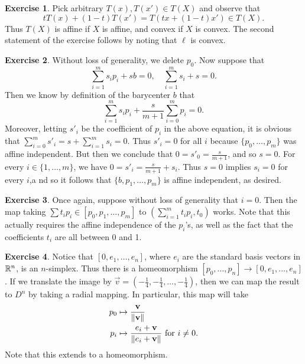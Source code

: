 \documentclass[10pt]{article}
\theoremstyle{definition}
\newtheorem{intex}{Exercise}[section]
\newenvironment{exercise}{\begin{intex}\label{\theintex}}{\end{intex}}
\begin{document}
\begin{exercise} \leavevmode
Pick arbitrary $T(x),T(x')\in T(X)$ and observe that \[tT(x)+(1-t)T(x')=T(tx+(1-t)x')\in T(X).\] Thus $T(X)$ is affine if $X$ is affine, and convex if $X$ is convex. The second statement of the exercise follows by noting that $\ell$ is convex. 
\end{exercise} 

\begin{exercise} \leavevmode
Without loss of generality, we delete $p_0$. Now suppose that \[\sum_{i=1}^ms_ip_i+sb=0,\quad\sum_{i=1}^ms_i+s=0.\] Then we know by definition of the barycenter $b$ that \[\sum_{i=1}^ms_ip_i+\frac s{m+1}\sum_{i=0}^mp_i=0.\] Moreover, letting $s'_i$ be the coefficient of $p_i$ in the above equation, it is obvious that $\sum_{i=0}^ms'_i=s+\sum_{i=1}^ms_i=0$. Thus $s'_i=0$ for all $i$ because $\{p_0,\dots,p_m\}$ was affine independent. But then we conclude that $0=s'_0=\frac s{m+1}$, and so $s=0$. For every $i\in\{1,\dots,m\}$, we have $0=s'_i=\frac s{m+1}+s_i$. Thus $s=0$ implies $s_i=0$ for every $i$,a nd so it follows that $\{b,p_1,\dots,p_m\}$ is affine independent, as desired.
\end{exercise} 

\begin{exercise} \leavevmode
Once again, suppose without loss of generality that $i=0$. Then the map taking $\sum t_ip_i\in[p_0,p_1,\dots,p_m]$ to $\left(\sum_{i=1}^mt_ip_i,t_0\right)$ works. Note that this actually requires the affine independence of the $p_i$'s, as well as the fact that the coefficients $t_i$ are all between 0 and 1. 
\end{exercise} 

\begin{exercise} \leavevmode
Notice that $[0,e_1,\dots,e_n]$, where $e_i$ are the standard basis vectors in $\mathbb{R}^n$, is an $n$-simplex. Thus there is a homeomorphism $[p_0,\dots,p_n]\to[0,e_1,\dots,e_n]$. If we translate the image by $\vec v=(-\frac14,-\frac14,\dots,-\frac14)$, then we can map the result to $D^n$ by taking a radial mapping. In particular, this map will take \begin{align*}p_0&\mapsto\frac{\mathbf v}{\lVert\mathbf v\rVert}\\p_i&\mapsto\frac{e_i+\mathbf v}{\lVert e_i+\mathbf v\rVert}~\text{for}~i\ne0.\end{align*} Note that this extends to a homeomorphism. 
\end{exercise} 
\end{document}
